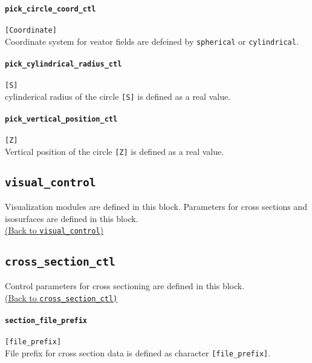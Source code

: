 \paragraph{\tt pick\_circle\_coord\_ctl}
\label{href_t:pick_circle_coord_ctl}
\verb|[Coordinate]| \\
Coordinate system for veator fields are defeined by {\tt spherical} or {\tt cylindrical}.

\paragraph{\tt pick\_cylindrical\_radius\_ctl}
\label{href_t:pick_cylindrical_radius_ctl}
\verb|[S]| \\
cylinderical radius of the circle {\tt [S]} is defined as a real value.

\paragraph{\tt pick\_vertical\_position\_ctl}
\label{href_t:pick_vertical_position_ctl}
\verb|[Z]| \\
Vertical position of the circle {\tt [Z]} is defined as a real value.

%

\subsection{\tt visual\_control}
\label{href_t:visual_control}
Visualization modules are defined in this block. Parameters for cross sections and isosurfaces are defined in this block. \\
\hyperref[href_i:visual_control]{(Back to {\tt visual\_control})}

%
%
\subsection{\tt cross\_section\_ctl}
\label{href_t:cross_section_ctl}
Control parameters for cross sectioning are defined in this block. \\
\hyperref[href_i:cross_section_ctl]{(Back to {\tt cross\_section\_ctl)}}

\paragraph{\tt section\_file\_prefix}
\label{href_t:section_file_prefix}
\verb|[file_prefix]| \\
File prefix for cross section data is defined as character \verb|[file_prefix]|.

